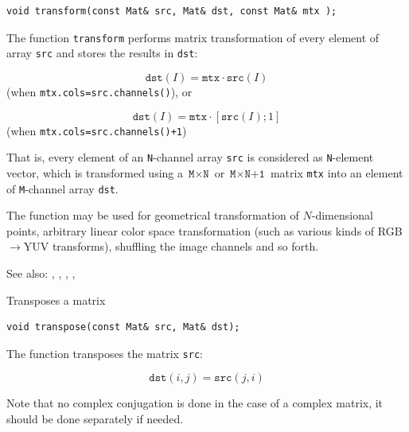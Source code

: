 \begin{lstlisting}
void transform(const Mat& src, Mat& dst, const Mat& mtx );
\end{lstlisting}
\begin{description}
\end{description}

The function \texttt{transform} performs matrix transformation of every element of array \texttt{src} and stores the results in \texttt{dst}:

\[
\texttt{dst}(I) = \texttt{mtx} \cdot \texttt{src}(I)
\]
(when \texttt{mtx.cols=src.channels()}), or

\[
\texttt{dst}(I) = \texttt{mtx} \cdot [\texttt{src}(I); 1]
\]
(when \texttt{mtx.cols=src.channels()+1})

That is, every element of an \texttt{N}-channel array \texttt{src} is
considered as \texttt{N}-element vector, which is transformed using
a $\texttt{M} \times \texttt{N}$ or $\texttt{M} \times \texttt{N+1}$ matrix \texttt{mtx} into
an element of \texttt{M}-channel array \texttt{dst}.

The function may be used for geometrical transformation of $N$-dimensional
points, arbitrary linear color space transformation (such as various kinds of RGB$\rightarrow$YUV transforms), shuffling the image channels and so forth.

See also: , , , , 

\label{transpose}
Transposes a matrix

\begin{lstlisting}
void transpose(const Mat& src, Mat& dst);
\end{lstlisting}
\begin{description}
\end{description}

The function  transposes the matrix \texttt{src}:

\[ \texttt{dst}(i,j) = \texttt{src}(j,i) \]

Note that no complex conjugation is done in the case of a complex
matrix, it should be done separately if needed.


